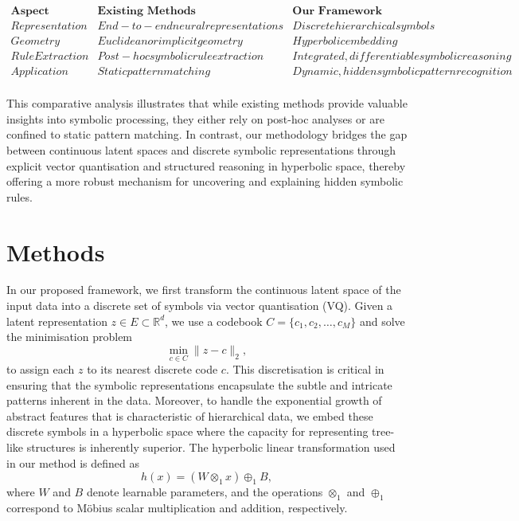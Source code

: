 \documentclass{article}
\begin{document}
\[
\begin{array}{l|c|c}
\textbf{Aspect} & \textbf{Existing Methods} & \textbf{Our Framework} \\\hline
Representation & End-to-end neural representations & Discrete hierarchical symbols \\
Geometry & Euclidean or implicit geometry & Hyperbolic embedding \\
Rule Extraction & Post-hoc symbolic rule extraction & Integrated, differentiable symbolic reasoning \\
Application & Static pattern matching & Dynamic, hidden symbolic pattern recognition \\
\end{array}
\]

This comparative analysis illustrates that while existing methods provide valuable insights into symbolic processing, they either rely on post-hoc analyses or are confined to static pattern matching. In contrast, our methodology bridges the gap between continuous latent spaces and discrete symbolic representations through explicit vector quantisation and structured reasoning in hyperbolic space, thereby offering a more robust mechanism for uncovering and explaining hidden symbolic rules.

\section{Methods}
In our proposed framework, we first transform the continuous latent space of the input data into a discrete set of symbols via vector quantisation (VQ). Given a latent representation \( z \in E \subset \mathbb{R}^d \), we use a codebook \( C = \{c_1, c_2, \ldots, c_M\} \) and solve the minimisation problem
\[
\min_{c \in C} \| z - c \|_2,
\]
to assign each \( z \) to its nearest discrete code \( c \). This discretisation is critical in ensuring that the symbolic representations encapsulate the subtle and intricate patterns inherent in the data. Moreover, to handle the exponential growth of abstract features that is characteristic of hierarchical data, we embed these discrete symbols in a hyperbolic space where the capacity for representing tree-like structures is inherently superior. The hyperbolic linear transformation used in our method is defined as
\[
h(x) = (W \otimes_1 x) \oplus_1 B,
\]
where \(W\) and \(B\) denote learnable parameters, and the operations \(\otimes_1\) and \(\oplus_1\) correspond to Möbius scalar multiplication and addition, respectively.
\end{document}
